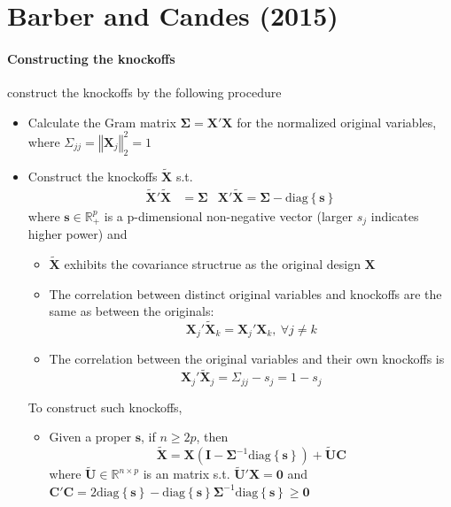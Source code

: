 \documentclass[twoside]{article}
\begin{document}
\section{Barber and Candes (2015)}
\paragraph{Constructing the knockoffs}
\citet{Barber2015} construct the knockoffs by the following procedure
\begin{itemize}
    \item Calculate the Gram matrix $\boldsymbol{\Sigma}=\mathbf{X'X}$ for the normalized original variables, where $\Sigma_{jj}=\left\Vert \mathbf{X}_j \right\Vert^2_2 = 1$
    \item Construct the knockoffs $\tilde{\mathbf{X}}$ s.t. 
    \begin{align*}
        \tilde{\mathbf{X}}'\tilde{\mathbf{X}} &= \boldsymbol{\Sigma} & {\mathbf{X}}'\tilde{\mathbf{X}} = \boldsymbol{\Sigma} -\mathrm{diag}\left\{\mathbf{s}\right\}
    \end{align*}
    where $\mathbf{s}\in\mathbb{R}^p_{+}$ is a p-dimensional non-negative vector (larger $s_j$ indicates higher power) and
    \begin{itemize}
        \item $\tilde{\mathbf{X}}$ exhibits the  covariance structrue as the original design $\mathbf{X}$
        \item The correlation between distinct original variables and knockoffs are the same as between the originals: $$ \mathbf{X}_j'\tilde{\mathbf{X}}_k = \mathbf{X}_j'{\mathbf{X}}_k,\ \forall j\neq k $$
        \item The correlation between the original variables and their own knockoffs is  $$ \mathbf{X}_j'\tilde{\mathbf{X}}_j = \Sigma_{jj}-s_j = 1-s_j $$
    \end{itemize}
    To construct such knockoffs, 
    \begin{itemize}
        \item Given a proper $\mathbf{s}$, if $n \geq  2p$, then  $$ \tilde{\mathbf{X}} = \mathbf{X}(\mathbf{I}-\boldsymbol{\Sigma}^{-1}\mathrm{diag}\left\{\mathbf{s}\right\}) + \tilde{\mathbf{U}}\mathbf{C} $$ where $\tilde{\mathbf{U}}\in \mathbb{R}^{n\times p}$ is an  matrix s.t. $\tilde{\mathbf{U}}'\mathbf{X}=\mathbf{0}$ and $\mathbf{C'C}=2\mathrm{diag}\left\{\mathbf{s}\right\} - \mathrm{diag}\left\{\mathbf{s}\right\}\boldsymbol{\Sigma}^{-1}\mathrm{diag}\left\{\mathbf{s}\right\} \geq \mathbf{0}$

\end{itemize}
\end{itemize}
\end{document}
